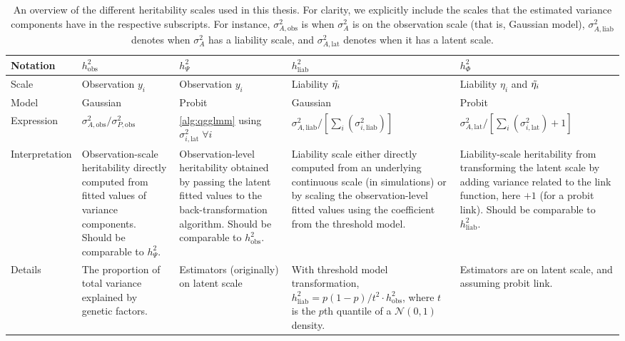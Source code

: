 \begin{landscape}
\begin{table}[htb]
\renewcommand{\arraystretch}{1.8}%
\begin{tabularx}{\linewidth}{lLLLL}
\toprule
Notation    & $h^2_\text{obs}$  &  $h^2_\Psi$ & $h^2_\text{liab}$   & $h^2_\Phi$ \\ \midrule
Scale       & Observation $y_i$ &  Observation $y_i$ & Liability $\Tilde{\eta_i}$ &  Liability $\eta_i$ and $\Tilde{\eta_i}$ \\
Model       & Gaussian &  Probit &  Gaussian & Probit \\
Expression  & $\sigma^2_{A,\text{obs}}/\sigma^2_{P,\text{obs}}$
            & \autoref{alg:qgglmm} using $\sigma^2_{i,\text{lat}} \; \forall i$
            & $\sigma^2_{A,\text{liab}}/\left[\sum_i (\sigma^2_{i,\text{liab}})\right]$
            & $\sigma^2_{A,\text{lat}}/\left[\sum_i (\sigma^2_{i,\text{lat}})+1\right]$ \\
Interpretation &
    Observation-scale heritability directly computed from fitted values of variance components. Should be comparable to $h^2_\Psi$. &
    Observation-level heritability obtained by passing the latent fitted values to the back-transformation algorithm. Should be comparable to $h^2_\text{obs}$. &
    Liability scale either directly computed from an underlying continuous scale (in simulations) or by scaling the observation-level fitted values using the coefficient from the threshold model. &
    Liability-scale heritability from transforming the latent scale by adding variance related to the link function, here $+1$ (for a probit link). Should be comparable to $h^2_\text{liab}$. \\
Details & %
            The proportion of total variance explained by genetic factors.
            & %
            Estimators (originally) on latent scale
            & %
            With threshold model transformation, $h^2_\text{liab}=p(1-p)/t^2 \cdot h^2_\text{obs}$, where $t$ is the $p$th quantile of a $\mathcal N(0,1)$ density.
            & %
            Estimators are on latent scale, and assuming probit link. \\
\bottomrule
\end{tabularx}
\caption[Overview over $h^2$ notation and scales]{An overview of the different heritability scales used in this thesis. For clarity, we explicitly include the scales that the estimated variance components have in the respective subscripts. For instance, $\sigma^2_{A,\text{obs}}$ is when $\sigma^2_A$ is on the observation scale (that is, Gaussian model), $\sigma^2_{A,\text{liab}}$ denotes when $\sigma^2_A$ has a liability scale, and $\sigma^2_{A,\text{lat}}$ denotes when it has a latent scale.}
\label{tab:h2 notation}
\end{table}
\end{landscape}